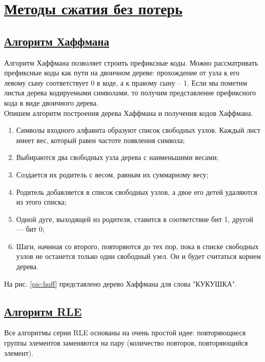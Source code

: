 \section*{\hyperlink{toc}{Методы сжатия без потерь}}



\subsection*{\hyperlink{toc}{Алгоритм Хаффмана}}

Алгоритм Хаффмана позволяет строить префиксные коды. Можно рассматривать префиксные коды как пути на двоичном дереве: прохождение от узла к его левому сыну соответствует 0 в коде, а к правому сыну -- 1. Если мы пометим листья дерева кодируемыми символами, то получим представление префиксного кода в виде двоичного дерева.\\
Опишем алгоритм построения дерева Хаффмана и получения кодов Хаффмана.
\begin{enumerate}

	\item Символы входного алфавита образуют список свободных узлов. Каждый лист имеет вес, который равен частоте появления символа;
	\item Выбираются два свободных узла дерева с наименьшими весами;
	\item Создается их родитель с весом, равным их суммарному весу;
	\item Родитель добавляется в список свободных узлов, а двое его детей удаляются из этого списка;
	\item Одной дуге, выходящей из родителя, ставится в соответствие бит 1, другой — бит 0;
	\item Шаги, начиная со второго, повторяются до тех пор, пока в списке свободных узлов не останется только один свободный узел. Он и будет считаться корнем дерева.
\end{enumerate}
На рис. \ref{pic:huff} представлено дерево Хаффмана для слова "КУКУШКА".



\subsection*{\hyperlink{toc}{Алгоритм RLE}}

Все алгоритмы серии RLE основаны на очень простой идее: повторяющиеся группы элементов заменяются на пару (количество повторов, повторяющийся элемент). 


